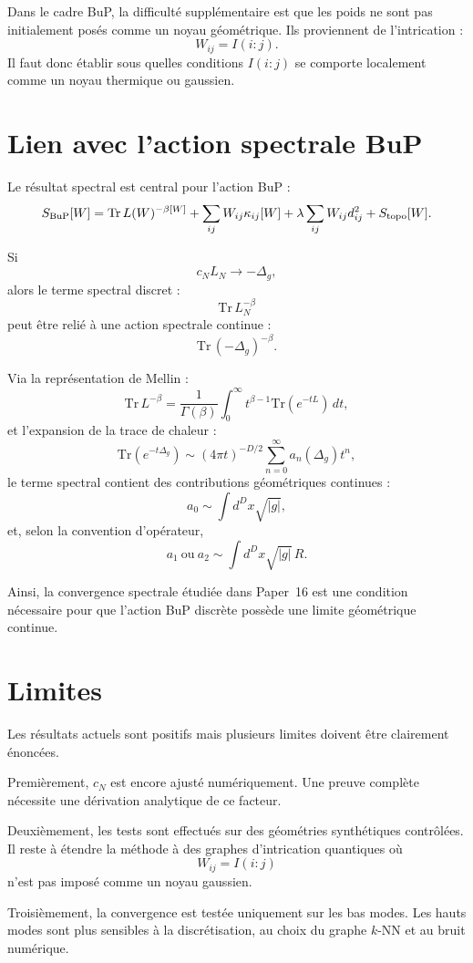 \documentclass[11pt,a4paper]{article}
\begin{document}
Dans le cadre BuP, la difficulté supplémentaire est que les poids ne sont pas
initialement posés comme un noyau géométrique. Ils proviennent de
l'intrication :
\[
W_{ij}=I(i:j).
\]
Il faut donc établir sous quelles conditions \(I(i:j)\) se comporte
localement comme un noyau thermique ou gaussien.

\section{Lien avec l'action spectrale BuP}

Le résultat spectral est central pour l'action BuP :
\[
S_{\rm BuP}[W]
=
\mathrm{Tr}\,L(W)^{-\beta[W]}
+
\sum_{ij}W_{ij}\kappa_{ij}[W]
+
\lambda\sum_{ij}W_{ij}d_{ij}^{2}
+
S_{\rm topo}[W].
\]

Si
\[
c_NL_N\to-\Delta_g,
\]
alors le terme spectral discret :
\[
\mathrm{Tr}\,L_N^{-\beta}
\]
peut être relié à une action spectrale continue :
\[
\mathrm{Tr}\,(-\Delta_g)^{-\beta}.
\]

Via la représentation de Mellin :
\[
\mathrm{Tr}\,L^{-\beta}
=
\frac{1}{\Gamma(\beta)}
\int_0^\infty
t^{\beta-1}
\mathrm{Tr}(e^{-tL})\,dt,
\]
et l'expansion de la trace de chaleur :
\[
\mathrm{Tr}(e^{-t\Delta_g})
\sim
(4\pi t)^{-D/2}
\sum_{n=0}^{\infty}
a_n(\Delta_g)t^n,
\]
le terme spectral contient des contributions géométriques continues :
\[
a_0\sim\int d^Dx\sqrt{|g|},
\]
et, selon la convention d'opérateur,
\[
a_1\ \text{ou}\ a_2
\sim
\int d^Dx\sqrt{|g|}\,R.
\]

Ainsi, la convergence spectrale étudiée dans Paper~16 est une condition
nécessaire pour que l'action BuP discrète possède une limite géométrique
continue.

\section{Limites}

Les résultats actuels sont positifs mais plusieurs limites doivent être
clairement énoncées.

Premièrement, \(c_N\) est encore ajusté numériquement. Une preuve complète
nécessite une dérivation analytique de ce facteur.

Deuxièmement, les tests sont effectués sur des géométries synthétiques
contrôlées. Il reste à étendre la méthode à des graphes d'intrication
quantiques où
\[
W_{ij}=I(i:j)
\]
n'est pas imposé comme un noyau gaussien.

Troisièmement, la convergence est testée uniquement sur les bas modes. Les
hauts modes sont plus sensibles à la discrétisation, au choix du graphe
\(k\)-NN et au bruit numérique.
\end{document}
